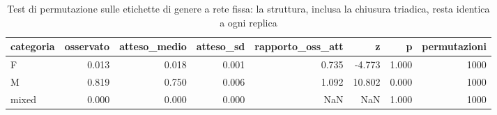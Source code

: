 \begin{table}
\centering
\caption{Test di permutazione sulle etichette di genere a rete fissa: la struttura, inclusa la chiusura triadica, resta identica a ogni replica}
\label{tab:t4_qap_genere}
\begin{tabular}{lrrrrrrr}
\toprule
categoria &  osservato &  atteso\_medio &  atteso\_sd &  rapporto\_oss\_att &      z &     p &  permutazioni \\
\midrule
        F &      0.013 &         0.018 &      0.001 &             0.735 & -4.773 & 1.000 &          1000 \\
        M &      0.819 &         0.750 &      0.006 &             1.092 & 10.802 & 0.000 &          1000 \\
    mixed &      0.000 &         0.000 &      0.000 &               NaN &    NaN & 1.000 &          1000 \\
\bottomrule
\end{tabular}
\end{table}
